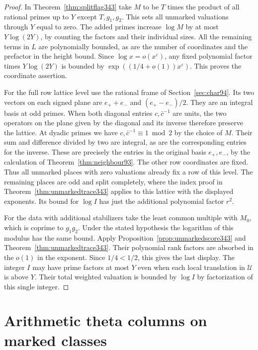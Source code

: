 \documentclass[a4paper,11pt]{article}
\theoremstyle{definition}
\theoremstyle{remark}
\numberwithin{equation}{section}
\begin{document}
\begin{proof}
In Theorem~\ref{thm:splitflag343} take $M$ to be $T$ times the product
of all rational primes up to $Y$ except $T,g_1,g_2$. This sets all
unmarked valuations through $Y$ equal to zero. The added primes
increase $\log M$ by at most $Y\log(2Y)$, by counting the factors
and their individual sizes. All the remaining terms in $L$ are
polynomially bounded, as are the number of coordinates and the
prefactor in the height bound. Since $\log x=o(x^\varepsilon)$,
any fixed polynomial factor times $Y\log(2Y)$ is bounded by
$\exp((1/4+o(1))x^\varepsilon)$. This proves the coordinate assertion.

For the full row lattice level use the rational frame of
Section~\ref{sec:char94}. Its two vectors on each signed plane are
$e_++e_-$ and $(e_+-e_-)/2$. They are an integral basis at odd
primes. When both diagonal entries $c,\bar c^{-1}$ are units, the
two operators on the plane given by the diagonal and its inverse
therefore preserve the lattice. At dyadic primes we have
$c,\bar c^{-1}\equiv1\bmod 2$ by the choice of $M$. Their sum and
difference divided by two are integral, as are the corresponding
entries for the inverse. These are precisely the entries in the
original basis $e_+,e_-$, by the calculation of
Theorem~\ref{thm:neighbour93}. The other row coordinates are fixed.
Thus all unmarked places with zero valuations already fix a row of
this level. The remaining places are odd and split completely,
where the index proof in Theorem~\ref{thm:unmarkedtrace343} applies
to this lattice with the displayed exponents. Its bound for $\log I$
has just the additional polynomial factor $r^2$.

For the data with additional stabilizers take the least common
multiple with $M_0$, which is coprime to $g_1g_2$. Under the stated
hypothesis the logarithm of this modulus has the same bound.
Apply Proposition~\ref{prop:unmarkedscore343} and
Theorem~\ref{thm:unmarkedtrace343}. Their polynomial rank factors
are absorbed in the $o(1)$ in the exponent. Since $1/4<1/2$, this
gives the last display. The integer $I$ may have prime factors at
most $Y$ even when each local translation in $\mathcal U$ is above
$Y$. Their total weighted valuation is bounded by $\log I$ by
factorization of this single integer.
\end{proof}

\section{Arithmetic theta columns on marked classes}\label{nav:chapter-marked-theta-columns}
\end{document}
